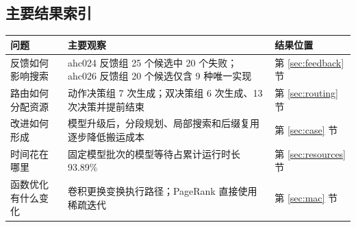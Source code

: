 \documentclass[11pt,a4paper,UTF8,fontset=none]{ctexart}
\newenvironment{smalltable}{\par\begingroup\small\setlength{\tabcolsep}{5pt}\noindent\ignorespaces}{\par\endgroup}
\begin{document}
\subsection*{主要结果索引}
\begin{smalltable}
\begin{tabularx}{\linewidth}{@{}lLL@{}}\toprule
问题 & 主要观察 & 结果位置\\\midrule
反馈如何影响搜索 & ahc024 反馈组 25 个候选中 20 个失败；ahc026 反馈组 20 个候选仅含 9 种唯一实现 & 第 \ref{sec:feedback} 节\\
路由如何分配资源 & 动作决策组 7 次生成；双决策组 6 次生成、13 次决策并提前结束 & 第 \ref{sec:routing} 节\\
改进如何形成 & 模型升级后，分段规划、局部搜索和后缀复用逐步降低搬运成本 & 第 \ref{sec:case} 节\\
时间花在哪里 & 固定模型批次的模型等待占累计运行时长 93.89\% & 第 \ref{sec:resources} 节\\
函数优化有什么变化 & 卷积更换变换执行路径；PageRank 直接使用稀疏迭代 & 第 \ref{sec:mac} 节\\\bottomrule
\end{tabularx}
\end{smalltable}

\clearpage
\clearpage
\clearpage
\clearpage
\clearpage
\clearpage
\clearpage
\clearpage
\clearpage
\end{document}
